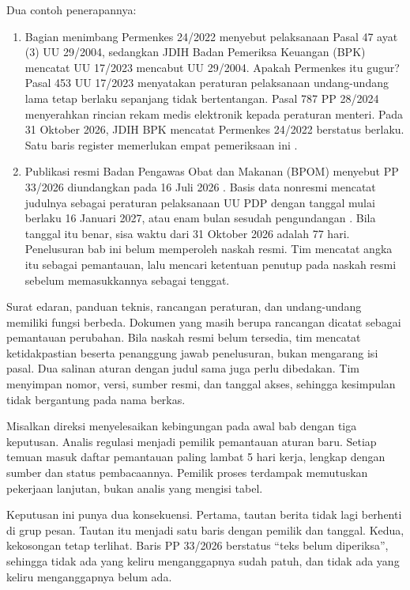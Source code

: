 Dua contoh penerapannya:
\begin{enumerate}
  \item Bagian menimbang Permenkes 24/2022 menyebut pelaksanaan Pasal 47 ayat (3) UU 29/2004,
  sedangkan JDIH Badan Pemeriksa Keuangan (BPK) mencatat UU 17/2023 mencabut UU 29/2004. Apakah
  Permenkes itu gugur? Pasal 453 UU 17/2023 menyatakan peraturan pelaksanaan undang-undang lama
  tetap berlaku sepanjang tidak bertentangan. Pasal 787 PP 28/2024 menyerahkan rincian rekam
  medis elektronik kepada peraturan menteri. Pada 31 Oktober 2026, JDIH BPK mencatat Permenkes
  24/2022 berstatus berlaku. Satu baris register memerlukan empat pemeriksaan ini
  \cite{permenkes24-2022,c03-uu17,pp28-2024-kesehatan}.
  \item Publikasi resmi Badan Pengawas Obat dan Makanan (BPOM) menyebut PP 33/2026 diundangkan
  pada 16 Juli 2026 \cite{bpom-pp33-2026-status}. Basis data nonresmi mencatat judulnya sebagai
  peraturan pelaksanaan UU PDP dengan tanggal mulai berlaku 16 Januari 2027, atau enam bulan
  sesudah pengundangan \cite{c03-pp33-nonresmi}. Bila tanggal itu benar, sisa waktu dari 31
  Oktober 2026 adalah 77 hari. Penelusuran bab ini belum memperoleh naskah resmi. Tim mencatat
  angka itu sebagai pemantauan, lalu mencari ketentuan penutup pada naskah resmi sebelum
  memasukkannya sebagai tenggat.
\end{enumerate}

Surat edaran, panduan teknis, rancangan peraturan, dan undang-undang memiliki fungsi berbeda.
Dokumen yang masih berupa rancangan dicatat sebagai pemantauan perubahan. Bila naskah resmi
belum tersedia, tim mencatat ketidakpastian beserta penanggung jawab penelusuran, bukan
mengarang isi pasal. Dua salinan aturan dengan judul sama juga perlu dibedakan. Tim menyimpan
nomor, versi, sumber resmi, dan tanggal akses, sehingga kesimpulan tidak bergantung pada nama
berkas.

\begin{kasus}[title={Kasus Medikara Health: Tautan di Grup Pesan}]
Misalkan direksi menyelesaikan kebingungan pada awal bab dengan tiga keputusan. Analis regulasi
menjadi pemilik pemantauan aturan baru. Setiap temuan masuk daftar pemantauan paling lambat 5
hari kerja, lengkap dengan sumber dan status pembacaannya. Pemilik proses terdampak memutuskan
pekerjaan lanjutan, bukan analis yang mengisi tabel.

Keputusan ini punya dua konsekuensi. Pertama, tautan berita tidak lagi berhenti di grup pesan.
Tautan itu menjadi satu baris dengan pemilik dan tanggal. Kedua, kekosongan tetap terlihat.
Baris PP 33/2026 berstatus ``teks belum diperiksa'', sehingga tidak ada yang keliru
menganggapnya sudah patuh, dan tidak ada yang keliru menganggapnya belum ada.
\end{kasus}

